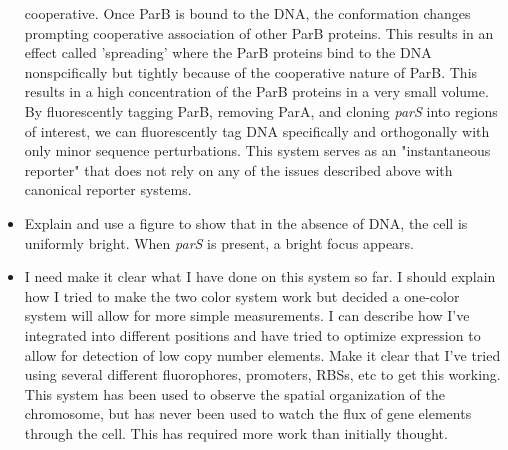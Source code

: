 \begin{itemize}
		cooperative. Once ParB is bound to the DNA, the conformation
		changes prompting cooperative association of other ParB
		proteins. This results in an effect called 'spreading' where the
		ParB proteins bind to the DNA nonspcifically but tightly because
		of the cooperative nature of ParB. This results in a high
		concentration of the ParB proteins in a very small volume. By
		fluorescently tagging ParB, removing ParA, and cloning
		\textit{parS} into regions of interest, we can fluorescently tag
		DNA specifically and orthogonally with only minor sequence
		perturbations. This system serves as an "instantaneous
		reporter" that does not rely on any of the issues described
		above with canonical reporter systems.
	\item Explain and use a figure to show that in the absence of DNA, the
		cell is uniformly bright. When \textit{parS} is present, a
		bright focus appears. 

	\item I need make it clear what I have done on this system so far. I
		should explain how I tried to make the two color system work but
		decided a one-color system will allow for more simple
		measurements. I can describe how I've integrated into different
		positions and have tried to optimize expression to allow for
		detection of low copy number elements. Make it clear that I've
		tried using several different fluorophores, promoters, RBSs, etc
		to get this working. This system has been used to observe the
		spatial organization of the chromosome, but has never been
		used to watch the flux of gene elements through the cell. This
		has required more work than initially thought. 
\end{itemize}
